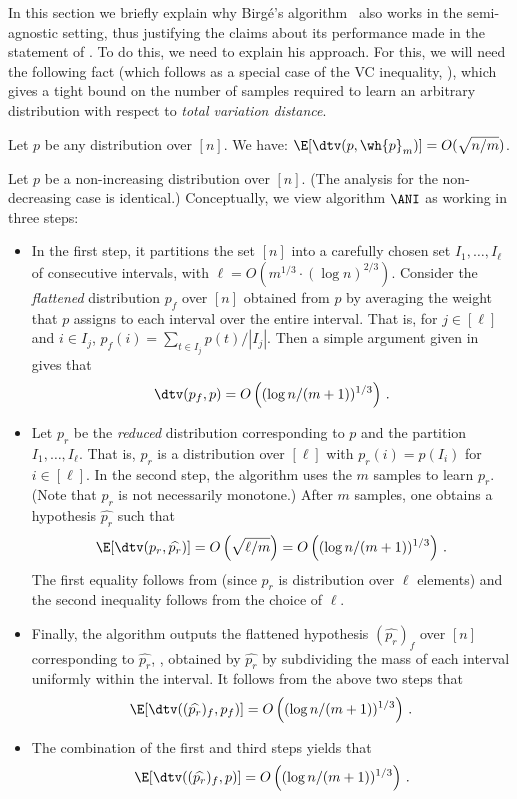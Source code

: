 In this section we briefly explain why Birg{\'e}'s algorithm~\cite{Birge:87b}
also works in the semi-agnostic setting,
{thus justifying the claims about its performance made in the
statement of .}
To do this, we need to explain
his approach. For this, we will need the following {fact (which follows as a special case of the VC inequality, {}}), 
which gives
a tight bound on the number of samples required to
learn an arbitrary distribution with respect to \emph{total variation distance}.

\begin{fact} \label{thm:folklore}
Let $p$ be any distribution over $[n]$. We have: $\E [ \dtv ( p, \wh{p}_m) ]  =  O( \sqrt{n/m})$.
\end{fact}


Let $p$ be a non-increasing distribution over $[n]$.
(The analysis for the non-decreasing case is identical.)
Conceptually, we view algorithm $\ANI$ as working in three steps:

\begin{itemize}
\item  In the first step, it partitions the set $[n]$ into a carefully chosen
set $I_1, \ldots, I_{\ell}$ of consecutive intervals, with $\ell = O(m^{1/3} \cdot (\log n)^{2/3})$.
Consider the \emph{flattened} distribution $p_f$ over $[n]$ obtained from $p$ by averaging the weight
that $p$ assigns to each interval over the entire interval. That is, for $j \in [\ell]$ and
$i \in I_j$, $p_f(i) = \sum_{t \in I_j} p(t) / |I_j|$.
Then a simple argument given in~\cite{Birge:87b} gives
that 
\[
\dtv(p_f, p) = O\left( ({\log n / (m+1)})^{1/3} \right)\,.
\]


\item Let $p_r$ be the \emph{reduced} distribution corresponding to $p$ and the partition $I_1, \ldots, I_{\ell}$.
That is, $p_r$ is a distribution over $[\ell]$ with $p_r(i) = p(I_i)$ for $i \in [\ell]$. In the second step, the algorithm uses the $m$ samples to learn $p_r$. (Note that $p_r$ is not necessarily monotone.)
After $m$ samples, one obtains a hypothesis $\widehat{p_r}$ such that
\[
\E [\dtv(p_r, \widehat{p_r})] =  O\left( \sqrt{\ell / m} \right) =
O\left( ({\log n / (m+1)})^{1/3} \right)\,.
\]
The first equality follows from  (since $p_r$ is distribution over $\ell$ elements) and
the second inequality follows from the choice of $\ell$.

\item Finally, the algorithm outputs the flattened hypothesis $(\widehat{p_r})_f$ over $[n]$
corresponding to  $\widehat{p_r}$, \ie, obtained by $\widehat{p_r}$ by subdividing
the mass of each interval uniformly within the interval. It follows from the above two steps that
\[
\E[\dtv ( (\widehat{p_r})_f, p_f)] =O\left( ({\log n / (m+1)})^{1/3}
\right)\,.
\]

\item The combination of the first and third steps yields that
\[
\E[\dtv ( (\widehat{p_r})_f, p)] =O\left( ({\log n / (m+1)})^{1/3}
\right)\,.
\]


\end{itemize}

